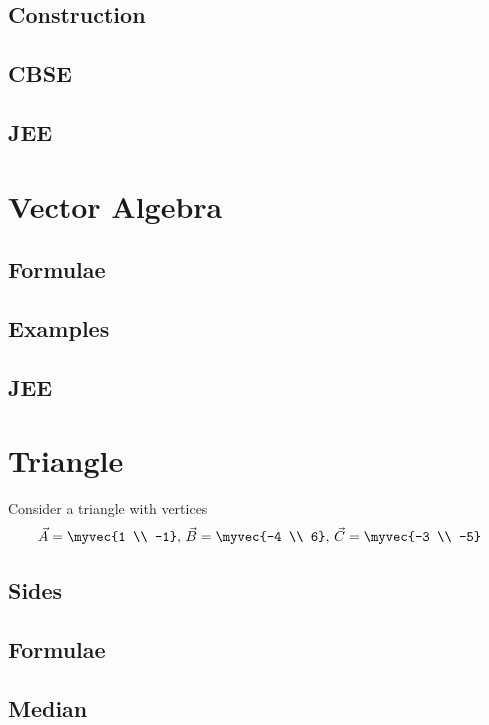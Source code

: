 \documentclass[journal]{IEEEtran}
\begin{document}
\subsection{Construction}

\subsection{CBSE}

\subsection{JEE}
 
%
\newpage
\section{Vector Algebra}
\subsection{Formulae}

\subsection{Examples}

\subsection{JEE}
 
\newpage
\appendices
\section{Triangle}
Consider a triangle with vertices
		\begin{align}
			\label{eq:app-tri-pts}
			\vec{A} = \myvec{1 \\ -1},\,
			\vec{B} = \myvec{-4 \\ 6},\,
			\vec{C} = \myvec{-3 \\ -5}
		\end{align}
\subsection{Sides}

\subsection{Formulae}

\subsection{Median}

\end{document}
